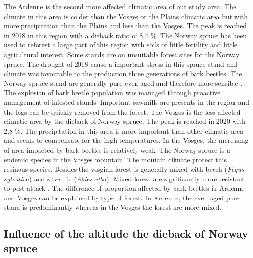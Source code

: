 \documentclass[3p,procedia]{elsarticle}
\begin{document}
The Ardenne is the second more affected climatic area of our study area. 
The climate in this area is colder than the Vosges or the Plains climatic area but with more precipitation than the Plains and less than the Vosges.
The peak is reached in 2018 in this region with a dieback ratio of 8,4 \%. 
The Norway spruce has been used to reforest a large part of this region with soils of little fertility and little agricultural interest. 
Some stands are on unsuitable forest sites for the Norway spruce. 
The drought of 2018 cause a important stress in this spruce stand and climate was favourable to the production three generations of bark beetles.
The Norway spruce stand are generally pure even aged and therefore more sensible \citep{jactel_2021}.
The explosion of bark beetle population was managed through proactive management of infested stands.
Important sawmills are presents in the region and the logs can be quickly removed from the forest.
The Vosges is the less affected climatic area by the dieback of Norway spruce.
The peak is reached in 2020 with 2,8 \%.
The precipitation in this area is more important than other climatic area and seems to compensate for the high temperatures.
In the Vosges, the increasing of area impacted by bark beetles is relatively weak.
The Norway spruce is a endemic species in the Vosges mountain. 
The moutain climate protect this resinous species. 
Besides the vosgian forest is generally mixed with beech (\textit{Fagus sylvatica}) and  silver fir (\textit{Abies alba}).
Mixed forest are significantly more resistant to pest attack \citep{jactel_2021}. 
The difference of proportion affected by bark beetles in Ardenne and Vosges can be explained by type of forest.
In Ardenne, the even aged pure stand is predominantly whereas in the Vosges  the forest are more mixed. 

\subsection{Influence of the altitude the dieback of Norway spruce}
\end{document}
